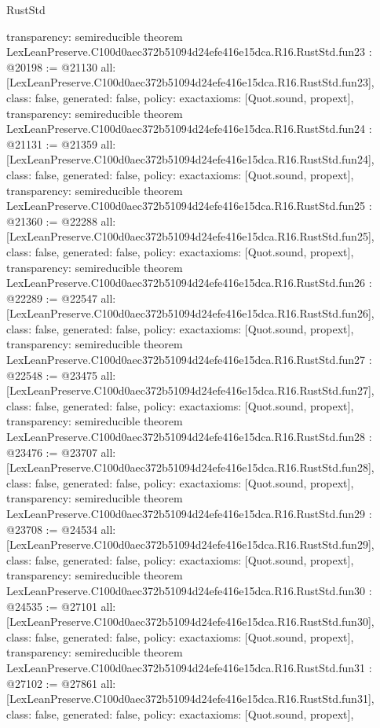 \begin{lexlean}{RustStd}
\begin{coremodule}
{  transparency: semireducible
}
theorem LexLeanPreserve.C100d0aec372b51094d24efe416e15dca.R16.RustStd.fun23 : @20198 := @21130 {
  all: [LexLeanPreserve.C100d0aec372b51094d24efe416e15dca.R16.RustStd.fun23],
  class: false,
  generated: false,
  policy: exact{axioms: [Quot.sound, propext]},
  transparency: semireducible
}
theorem LexLeanPreserve.C100d0aec372b51094d24efe416e15dca.R16.RustStd.fun24 : @21131 := @21359 {
  all: [LexLeanPreserve.C100d0aec372b51094d24efe416e15dca.R16.RustStd.fun24],
  class: false,
  generated: false,
  policy: exact{axioms: [Quot.sound, propext]},
  transparency: semireducible
}
theorem LexLeanPreserve.C100d0aec372b51094d24efe416e15dca.R16.RustStd.fun25 : @21360 := @22288 {
  all: [LexLeanPreserve.C100d0aec372b51094d24efe416e15dca.R16.RustStd.fun25],
  class: false,
  generated: false,
  policy: exact{axioms: [Quot.sound, propext]},
  transparency: semireducible
}
theorem LexLeanPreserve.C100d0aec372b51094d24efe416e15dca.R16.RustStd.fun26 : @22289 := @22547 {
  all: [LexLeanPreserve.C100d0aec372b51094d24efe416e15dca.R16.RustStd.fun26],
  class: false,
  generated: false,
  policy: exact{axioms: [Quot.sound, propext]},
  transparency: semireducible
}
theorem LexLeanPreserve.C100d0aec372b51094d24efe416e15dca.R16.RustStd.fun27 : @22548 := @23475 {
  all: [LexLeanPreserve.C100d0aec372b51094d24efe416e15dca.R16.RustStd.fun27],
  class: false,
  generated: false,
  policy: exact{axioms: [Quot.sound, propext]},
  transparency: semireducible
}
theorem LexLeanPreserve.C100d0aec372b51094d24efe416e15dca.R16.RustStd.fun28 : @23476 := @23707 {
  all: [LexLeanPreserve.C100d0aec372b51094d24efe416e15dca.R16.RustStd.fun28],
  class: false,
  generated: false,
  policy: exact{axioms: [Quot.sound, propext]},
  transparency: semireducible
}
theorem LexLeanPreserve.C100d0aec372b51094d24efe416e15dca.R16.RustStd.fun29 : @23708 := @24534 {
  all: [LexLeanPreserve.C100d0aec372b51094d24efe416e15dca.R16.RustStd.fun29],
  class: false,
  generated: false,
  policy: exact{axioms: [Quot.sound, propext]},
  transparency: semireducible
}
theorem LexLeanPreserve.C100d0aec372b51094d24efe416e15dca.R16.RustStd.fun30 : @24535 := @27101 {
  all: [LexLeanPreserve.C100d0aec372b51094d24efe416e15dca.R16.RustStd.fun30],
  class: false,
  generated: false,
  policy: exact{axioms: [Quot.sound, propext]},
  transparency: semireducible
}
theorem LexLeanPreserve.C100d0aec372b51094d24efe416e15dca.R16.RustStd.fun31 : @27102 := @27861 {
  all: [LexLeanPreserve.C100d0aec372b51094d24efe416e15dca.R16.RustStd.fun31],
  class: false,
  generated: false,
  policy: exact{axioms: [Quot.sound, propext]},
}
\end{coremodule}
\end{lexlean}
